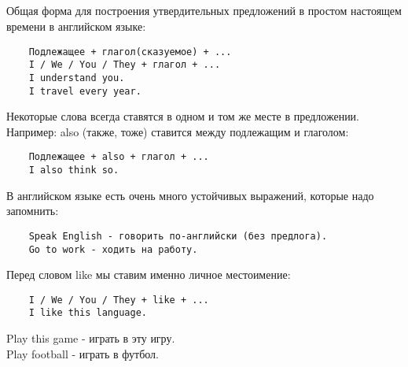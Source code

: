 \subsection*{}
Общая форма для построения утвердительных предложений в простом настоящем времени в английском языке:
\begin{verbatim}
    Подлежащее + глагол(сказуемое) + ...
    I / We / You / They + глагол + ...
    I understand you.
    I travel every year.
\end{verbatim}

Некоторые слова всегда ставятся в одном и том же месте в предложении. Например: also (также, тоже) ставится между
подлежащим и глаголом:
\begin{verbatim}
    Подлежащее + also + глагол + ...
    I also think so.
\end{verbatim}

В английском языке есть очень много устойчивых выражений, которые надо запомнить:
\begin{verbatim}
    Speak English - говорить по-английски (без предлога).
    Go to work - ходить на работу.
\end{verbatim}

Перед словом like мы ставим именно личное местоимение:
\begin{verbatim}
    I / We / You / They + like + ...
    I like this language.
\end{verbatim}
Play this game - играть в эту игру.\\
Play football - играть в футбол.